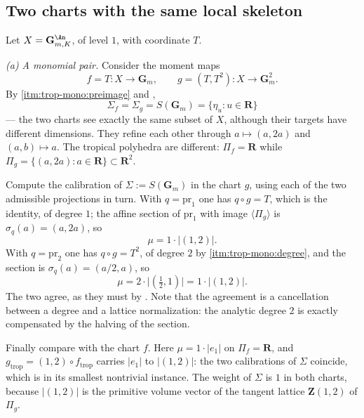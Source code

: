 \subsection{Two charts with the same local skeleton}

\begin{example}
\label{ex:trop-two-charts}
Let $X=\mathbf G_{m,K}^{\An}$, of level $1$, with coordinate $T$.

\emph{(a) A monomial pair.} Consider the moment maps
\[
 f=T:X\to\mathbf G_m,
 \qquad
 g=(T,T^2):X\to\mathbf G_m^2 .
\]
By  \cref{itm:trop-mono:preimage} and
,
\[
 \Sigma_f=\Sigma_g=S(\mathbf G_m)=\{\eta_u:u\in\mathbf R\}
\]
--- the two charts see exactly the same subset of $X$, although their targets
have different dimensions. They refine each other through
$a\mapsto(a,2a)$ and $(a,b)\mapsto a$.
The tropical polyhedra are different: $\Pi_f=\mathbf R$ while
$\Pi_g=\{(a,2a):a\in\mathbf R\}\subset\mathbf R^2$.

Compute the calibration of $\Sigma:=S(\mathbf G_m)$ in the chart $g$, using
each of the two admissible projections in turn. With $q=\mathrm{pr}_1$ one
has $q\circ g=T$, which is the identity, of degree $1$; the affine section
of $\mathrm{pr}_1$ with image $\langle\Pi_g\rangle$ is
$\sigma_q(a)=(a,2a)$, so
\[
 \mu=1\cdot|(1,2)| .
\]
With $q=\mathrm{pr}_2$ one has $q\circ g=T^2$, of degree $2$ by
 \cref{itm:trop-mono:degree}, and the section
is $\sigma_{q}(a)=(a/2,a)$, so
\[
 \mu=2\cdot\bigl|(\tfrac12,1)\bigr|=1\cdot|(1,2)| .
\]
The two agree, as they must by
. Note that the agreement is a
cancellation between a degree and a lattice normalization: the analytic
degree $2$ is exactly compensated by the halving of the section.

Finally compare with the chart $f$. Here
$\mu=1\cdot|e_1|$ on $\Pi_f=\mathbf R$, and
$g_{\mathrm{trop}}=(1,2)\circ f_{\mathrm{trop}}$ carries $|e_1|$ to
$|(1,2)|$: the two calibrations of $\Sigma$ coincide, which is
 in its smallest nontrivial
instance. The weight of $\Sigma$ is $1$ in both charts, because $|(1,2)|$ is
the primitive volume vector of the tangent lattice
$\mathbf Z(1,2)$ of $\Pi_g$.


\end{example}
